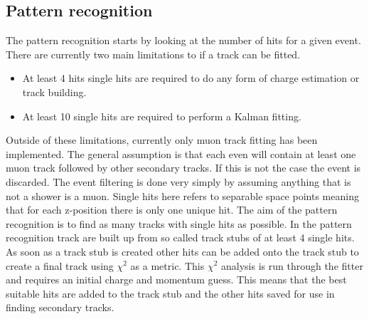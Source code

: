 
\subsection{Pattern recognition}
The pattern recognition starts by looking at the number of hits for a given event. There are currently two main limitations to if a track can be fitted.
\begin{itemize}
\item At least 4 hits single hits are required to do any form of charge estimation or track building.
\item At least 10 single hits are required to perform a Kalman fitting.
\end{itemize}
Outside of these limitations, currently only muon track fitting has been implemented. The general assumption is that each even will contain at least one muon track followed by other secondary tracks. If this is not the case the event is discarded. The event filtering is done very simply by assuming anything that is not a shower is a muon. Single hits here refers to separable space points meaning that for each z-position there is only one unique hit. The aim of the pattern recognition is to find as many tracks with single hits as possible. In the pattern recognition track are built up from so called track stubs of at least 4 single hits. As soon as a track stub is created other hits can be added onto the track stub to create a final track using $\chi^2$ as a metric. This $\chi^2$ analysis is run through the fitter and requires an initial charge and momentum guess. This means that the best suitable hits are added to the track stub and the other hits saved for use in finding secondary tracks. 

